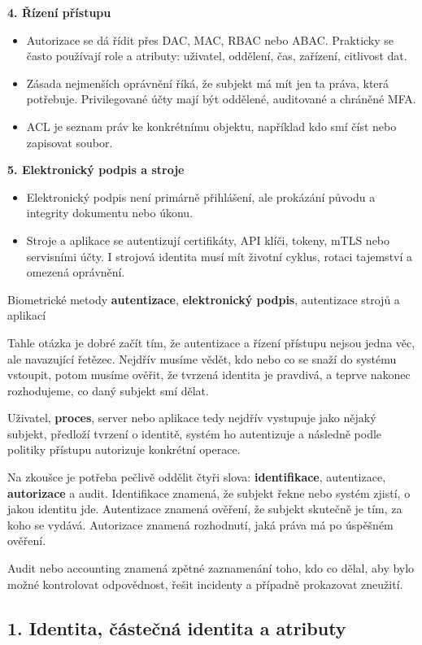 \textbf{4. Řízení přístupu}
\begin{itemize}
  \item Autorizace se dá řídit přes DAC, MAC, RBAC nebo ABAC. Prakticky se často používají role a atributy: uživatel, oddělení, čas, zařízení, citlivost dat.
  \item Zásada nejmenších oprávnění říká, že subjekt má mít jen ta práva, která potřebuje. Privilegované účty mají být oddělené, auditované a chráněné MFA.
  \item ACL je seznam práv ke konkrétnímu objektu, například kdo smí číst nebo zapisovat soubor.
\end{itemize}

\textbf{5. Elektronický podpis a stroje}
\begin{itemize}
  \item Elektronický podpis není primárně přihlášení, ale prokázání původu a integrity dokumentu nebo úkonu.
  \item Stroje a aplikace se autentizují certifikáty, API klíči, tokeny, mTLS nebo servisními účty. I strojová identita musí mít životní cyklus, rotaci tajemství a omezená oprávnění.
\end{itemize}

Biometrické metody \textbf{autentizace}, \textbf{elektronický podpis}, autentizace strojů a aplikací

Tahle otázka je dobré začít tím, že autentizace a řízení přístupu nejsou jedna věc, ale navazující řetězec. Nejdřív musíme vědět, kdo nebo co se snaží do systému vstoupit, potom musíme ověřit, že tvrzená identita je pravdivá, a teprve nakonec rozhodujeme, co daný subjekt smí dělat.

Uživatel, \textbf{proces}, server nebo aplikace tedy nejdřív vystupuje jako nějaký subjekt, předloží tvrzení o identitě, systém ho autentizuje a následně podle politiky přístupu autorizuje konkrétní operace.

Na zkoušce je potřeba pečlivě oddělit čtyři slova: \textbf{identifikace}, autentizace, \textbf{autorizace} a audit. Identifikace znamená, že subjekt řekne nebo systém zjistí, o jakou identitu jde. Autentizace znamená ověření, že subjekt skutečně je tím, za koho se vydává. Autorizace znamená rozhodnutí, jaká práva má po úspěšném ověření.

Audit nebo accounting znamená zpětné zaznamenání toho, kdo co dělal, aby bylo možné kontrolovat odpovědnost, řešit incidenty a případně prokazovat zneužití.

\subsection*{1. Identita, částečná identita a atributy}

